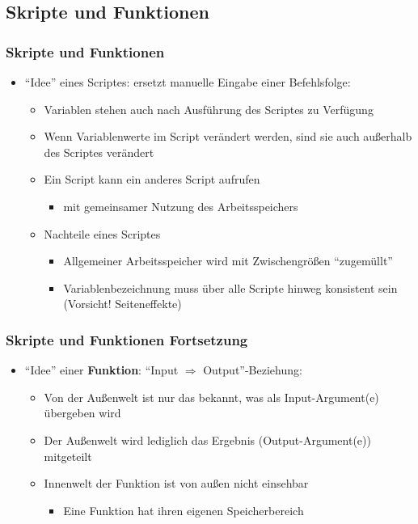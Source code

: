   \subsection{Skripte und Funktionen}
  \begin{frame}
      \frametitle{Skripte und Funktionen}
      \begin{itemize}
        \item ``Idee'' eines Scriptes: ersetzt manuelle Eingabe einer Befehlsfolge:
        \begin{itemize}
          \item Variablen stehen auch nach Ausführung des Scriptes zu Verfügung
          \item Wenn Variablenwerte im Script verändert werden, sind sie auch außerhalb des Scriptes verändert
          \item Ein Script kann ein anderes Script aufrufen
          \begin{itemize}
            \item mit gemeinsamer Nutzung des Arbeitsspeichers
          \end{itemize}
          \item Nachteile eines Scriptes
          \begin{itemize}
            \item Allgemeiner Arbeitsspeicher wird mit Zwischengrößen ``zugemüllt''
            \item Variablenbezeichnung muss über alle Scripte hinweg konsistent sein (\alert{Vorsicht!} Seiteneffekte)
          \end{itemize}
        \end{itemize}
      \end{itemize}
  \end{frame}

  \begin{frame}
      \frametitle{Skripte und Funktionen Fortsetzung}
      \begin{itemize}
        \item ``Idee'' einer \textbf{Funktion}: ``Input $\Rightarrow$ Output''-Beziehung:
        \begin{itemize}
          \item Von der Außenwelt ist nur das bekannt, was als Input-Argument(e) übergeben wird
          \item Der Außenwelt wird lediglich das Ergebnis (Output-Argument(e)) mitgeteilt
          \item Innenwelt der Funktion ist von außen nicht einsehbar
          \begin{itemize}
            \item Eine Funktion hat ihren eigenen Speicherbereich
          \end{itemize}
        \end{itemize}
      \end{itemize}
  \end{frame}

